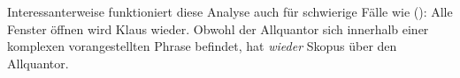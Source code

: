 %
%
%
%
%
%
%
Interessanterweise funktioniert diese Analyse auch für schwierige Fälle wie ():
\ea 
Alle Fenster öffnen wird Klaus wieder.
\z
Obwohl der Allquantor sich innerhalb einer komplexen vorangestellten Phrase befindet, hat
\emph{wieder} Skopus über den Allquantor.

